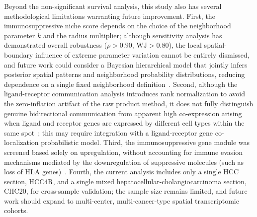 \documentclass[12pt, a4paper]{article}
\begin{document}
Beyond the non-significant survival analysis, this study also has several methodological limitations warranting future improvement. First, the immunosuppressive niche score depends on the choice of the neighborhood parameter $k$ and the radius multiplier; although sensitivity analysis has demonstrated overall robustness ($\rho > 0.90$, $\text{WJ} > 0.80$), the local spatial-boundary influence of extreme parameter variation cannot be entirely dismissed, and future work could consider a Bayesian hierarchical model that jointly infers posterior spatial patterns and neighborhood probability distributions, reducing dependence on a single fixed neighborhood definition~\citep{kleshchevnikov2022cell2location,gelman2013bayesian}. Second, although the ligand-receptor communication analysis introduces rank normalization to avoid the zero-inflation artifact of the raw product method, it does not fully distinguish genuine bidirectional communication from apparent high co-expression arising when ligand and receptor genes are expressed by different cell types within the same spot~\citep{cang2023commot}; this may require integration with a ligand-receptor gene co-localization probabilistic model. Third, the immunosuppressive gene module was screened based solely on upregulation, without accounting for immune evasion mechanisms mediated by the downregulation of suppressive molecules (such as loss of HLA genes)~\citep{montesion2021hla}. Fourth, the current analysis includes only a single HCC section, HCC4R, and a single mixed hepatocellular-cholangiocarcinoma section, CHC20, for cross-sample validation; the sample size remains limited, and future work should expand to multi-center, multi-cancer-type spatial transcriptomic cohorts.
\end{document}
